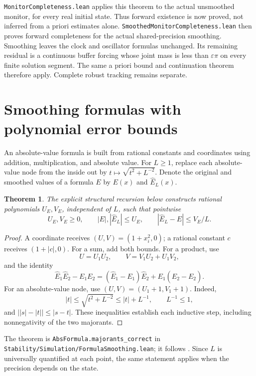 \documentclass[11pt]{article}
\newtheorem{theorem}{Theorem}[section]
\newcommand{\code}[1]{{\small\nolinkurl{#1}}}
\begin{document}
\code{MonitorCompleteness.lean} applies this theorem to the actual
unsmoothed monitor, for every real initial state. Thus forward existence
is now proved, not inferred from a priori estimates alone.
\code{SmoothedMonitorCompleteness.lean} then proves forward completeness
for the actual shared-precision smoothing. Smoothing leaves the clock
and oscillator formulas unchanged. Its remaining residual is a continuous
buffer forcing whose joint mass is less than $\varepsilon\pi$ on every
finite solution segment. The same a priori bound and continuation theorem
therefore apply. Complete robust tracking remains separate.

\section{Smoothing formulas with polynomial error bounds}

An absolute-value formula is built from rational constants and coordinates
using addition, multiplication, and absolute value. For $L\ge1$, replace
each absolute-value node from the inside out by
$t\mapsto\sqrt{t^2+L^{-2}}$. Denote the original and smoothed values of a
formula $E$ by $E(x)$ and $\widehat E_L(x)$.

\begin{theorem}
The explicit structural recursion below constructs rational polynomials
$U_E,V_E$, independent of $L$, such that pointwise
\[
 U_E,V_E\ge0,\qquad |E|,|\widehat E_L|\le U_E,\qquad
 |\widehat E_L-E|\le V_E/L.
\]
\end{theorem}

\begin{proof}
A coordinate receives $(U,V)=(1+x_i^2,0)$; a rational constant $c$ receives
$(1+|c|,0)$. For a sum, add both bounds. For a product, use
\[
 U=U_1U_2,\qquad V=V_1U_2+U_1V_2,
\]
and the identity
\[
 \widehat E_1\widehat E_2-E_1E_2
 = (\widehat E_1-E_1)\widehat E_2
     +E_1(\widehat E_2-E_2).
\]
For an absolute-value node, use $(U,V)=(U_1+1,V_1+1)$.
Indeed,
\[
 |t|\le\sqrt{t^2+L^{-2}}\le|t|+L^{-1},\qquad L^{-1}\le1,
\]
and $\bigl||s|-|t|\bigr|\le|s-t|$. These inequalities establish each
inductive step, including nonnegativity of the two majorants.
\end{proof}

The theorem is \code{AbsFormula.majorants_correct} in
\code{Stability/Simulation/FormulaSmoothing.lean}; it follows
\cite[Lemma 5.1]{korda}. Since $L$ is universally quantified at each point,
the same statement applies when the precision depends on the state.
\end{document}
